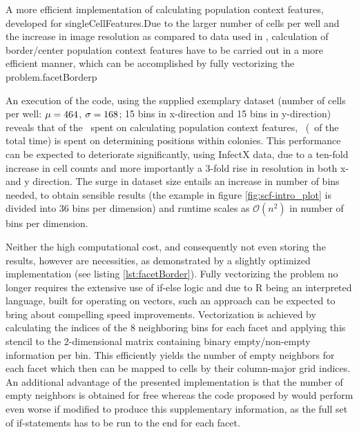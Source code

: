 \begin{rlisting}{A more efficient implementation of calculating population context features, developed for singleCellFeatures.}{Due to the larger number of cells per well and the increase in image resolution as compared to data used in \cite{Knapp2011}, calculation of border/center population context features have to be carried out in a more efficient manner, which can be accomplished by fully vectorizing the problem.}{facetBorder}{p}

\end{rlisting}


An execution of the code, using the supplied exemplary dataset (number of cells per well: $\mu=464$, $\sigma=168$; 15 bins in x-direction and 15 bins in y-direction) reveals that of the \knitrScfRnaicellTotal\ spent on calculating population context features, \knitrScfRnaicellEdgepos\ (\knitrScfRnaicellPercentage\ of the total time) is spent on determining positions within colonies. This performance can be expected to deteriorate significantly, using InfectX data, due to a ten-fold increase in cell counts and more importantly a 3-fold rise in resolution in both x- and y direction. The surge in dataset size entails an increase in number of bins needed, to obtain sensible results (the example in figure \ref{fig:scf-intro_plot} is divided into 36 bins per dimension) and runtime scales as $\mathcal{O}(n^2)$ in number of bins per dimension.

Neither the high computational cost, and consequently not even storing the results, however are necessities, as demonstrated by a slightly optimized implementation (see listing \ref{lst:facetBorder}). Fully vectorizing the problem no longer requires the extensive use of if-else logic and due to R being an interpreted language, built for operating on vectors, such an approach can be expected to bring about compelling speed improvements. Vectorization is achieved by calculating the indices of the 8 neighboring bins for each facet and applying this stencil to the 2-dimensional matrix containing binary empty/non-empty information per bin. This efficiently yields the number of empty neighbors for each facet which then can be mapped to cells by their column-major grid indices. An additional advantage of the presented implementation is that the number of empty neighbors is obtained for free whereas the code proposed by \citeauthor{Knapp2011} would perform even worse if modified to produce this supplementary information, as the full set of if-statements has to be run to the end for each facet.

